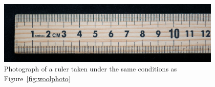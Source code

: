%

\begin{figure}[!h]
  \centering
  \includegraphics[scale=0.39]{figrule.jpg}
  \caption{Photograph of a ruler taken under the same conditions as Figure~\ref{fig:woolphoto}}
  \label{fig:ruler}
\end{figure}

%


